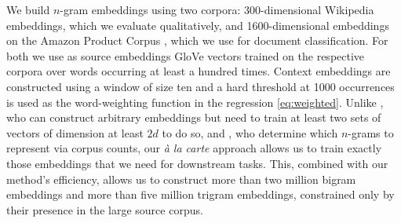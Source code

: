\documentclass[11pt,a4paper]{article}
\begin{document}
We build $n$-gram embeddings using two corpora: 300-dimensional Wikipedia embeddings, which we evaluate qualitatively, and 1600-dimensional embeddings on the Amazon Product Corpus \cite{McAuley:15}, which we use for document classification.
For both we use as source embeddings GloVe vectors trained on the respective corpora over words occurring at least a hundred times.
Context embeddings are constructed using a window of size ten and a hard threshold at 1000 occurrences is used as the word-weighting function in the regression \eqref{eq:weighted}.
Unlike \citet{Poliak:17}, who can construct arbitrary embeddings but need to train at least two sets of vectors of dimension at least $2d$ to do so, and \citet{Yin:14}, who determine which $n$-grams to represent via corpus counts, our {\em\`a la carte} approach allows us to train exactly those embeddings that we need for downstream tasks.
This, combined with our method's efficiency, allows us to construct more than two million bigram embeddings and more than five million trigram embeddings, constrained only by their presence in the large source corpus.
\end{document}
